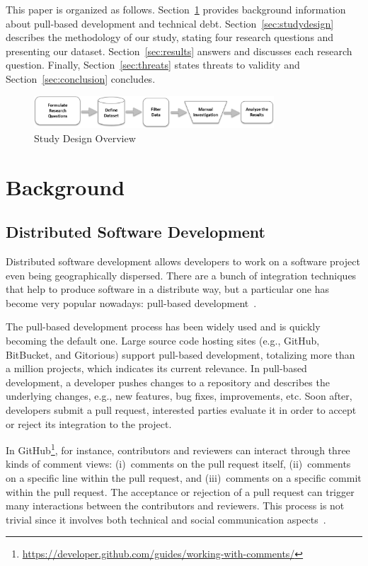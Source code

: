 \documentclass{sig-alternate}
\begin{document}
This paper is organized as follows. Section~\ref{sec:background} provides background information about
pull-based development
and technical debt. Section~\ref{sec:studydesign} describes the methodology of our study, stating
four research questions and presenting our dataset.
Section~\ref{sec:results} answers and discusses each research question.
Finally,
Section~\ref{sec:threats} states threats to validity
and Section~\ref{sec:conclusion} concludes.

\begin{figure}[!t]
\vspace{10pt}
\begin{center}
\includegraphics[width=0.8\textwidth]{study_design.png}
\caption{Study Design Overview}
\label{fig:design}
\end{center}
\end{figure}

\section{Background}
\label{sec:background}

\subsection{Distributed Software Development}
\label{sec:dsd}
Distributed software development allows developers to work on a software project even being geographically dispersed. There are a bunch of integration techniques that help to produce software in a distribute way, but a particular one has become very popular nowadays: pull-based development~\cite{8}.

The pull-based development process has been widely used and is quickly becoming the default one. 
%
Large source code hosting sites (e.g., GitHub, BitBucket, and Gitorious) support pull-based development, totalizing more than a million projects, which indicates its current relevance. 
%
In pull-based development, a developer pushes changes to a repository and describes the underlying changes, e.g., new features, bug fixes, improvements, etc.
%
Soon after, developers submit a pull request, interested parties evaluate it in order
to accept or reject its integration to the project.
%

In GitHub\footnote{\url{https://developer.github.com/guides/working-with-comments/}}, for instance, contributors and reviewers can interact through three kinds of comment views: (i)~{comments on the pull request itself}, (ii)~{comments on a specific line within the pull request}, and (iii)~{comments on a specific commit within the pull request}. 
%
The acceptance or rejection of a pull request can trigger many interactions between the contributors and reviewers. 
This process is not trivial since it involves both technical and social communication aspects~\cite{15}.
\end{document}
